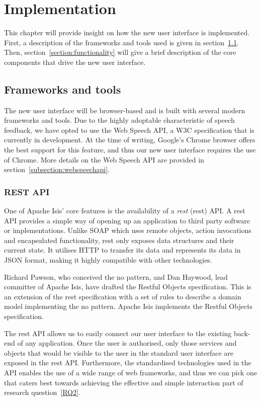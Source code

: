 \chapter{Implementation}
\label{chapter:implementation}
This chapter will provide insight on how the new user interface is implemented. First, a description of the frameworks and tools used is given in section~\ref{section:frameworkandtools}. Then, section~\ref{section:functionality} will give a brief description of the core components that drive the new user interface.

\section{Frameworks and tools}
\label{section:frameworkandtools}
The new user interface will be browser-based and is built with several modern frameworks and tools. Due to the highly adoptable characteristic of speech feedback, we have opted to use the Web Speech API, a W3C specification that is currently in development. At the time of writing, Google's Chrome browser offers the best support for this feature, and thus our new user interface requires the use of Chrome. More details on the Web Speech API are provided in section~\ref{subsection:webspeechapi}.

\subsection{REST API}
\label{subsection:restapi}
One of Apache Isis' core features is the availability of a \textit{\acrlong{rest}} (\acrshort{rest}) API. A \acrshort{rest} API provides a simple way of opening up an application to third party software or implementations. Unlike SOAP which uses remote objects, action invocations and encapsulated functionality, \acrshort{rest} only exposes data structures and their current state\cite{battle2008bridging}. It utilises HTTP to transfer its data and represents its data in JSON format, making it highly compatible with other technologies.

Richard Pawson, who conceived the \acrshort{no} pattern, and Dan Haywood, lead committer of Apache Isis, have drafted the Restful Objects specification. This is an extension of the \acrshort{rest} specification with a set of rules to describe a domain model implementing the \acrshort{no} pattern\cite{Restf62:online}. Apache Isis implements the Restful Objects specification.

The \acrshort{rest} API allows us to easily connect our user interface to the existing back-end of any application. Once the user is authorised, only those services and objects that would be visible to the user in the standard user interface are exposed in the \acrshort{rest} API. Furthermore, the standardised technologies used in the API enables the use of a wide range of web frameworks, and thus we can pick one that caters best towards achieving the effective and simple interaction part of research question~\ref{RQ2}.


